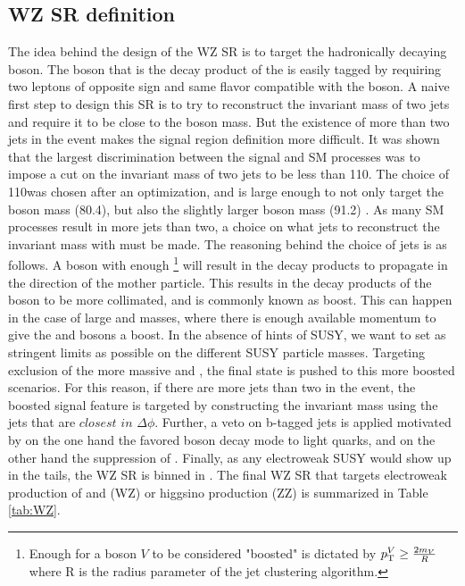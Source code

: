 \subsection{WZ SR definition}
The idea behind the design of the WZ SR is to target the hadronically decaying \PW boson. 
The \PZ boson that is the decay product of the \PSGczDt is easily tagged by requiring two leptons of opposite sign and same flavor compatible with the \PZ boson.
A naive first step to design this SR is to try to reconstruct the invariant mass of two jets and require it to be close to the \PW boson mass.
But the existence of more than two jets in the event makes the signal region definition more difficult. 
It was shown that the largest discrimination between the signal and SM processes was to impose a cut on the invariant mass of two jets to be less than 110\GeV. 
The choice of 110\GeV was chosen after an optimization, and is large enough to not only target the \PW boson mass (80.4\GeV), but also the slightly larger \PZ boson mass (91.2\GeV) \cite{PhysRevD.98.030001}. 
As many SM processes result in more jets than two, a choice on what jets to reconstruct the invariant mass with must be made. 
The reasoning behind the choice of jets is as follows. 
A \PW boson with enough \pt\footnote{Enough \pt for a boson $V$ to be considered "boosted" is dictated by $p_{\mathrm{T}}^{V}\geq\frac{2m_{V}}{R}$ where R is the radius parameter of the jet clustering algorithm.} will result in the decay products to propagate in the direction of the mother particle. 
This results in the decay products of the \PW boson to be more collimated, and is commonly known as boost. 
This can happen in the case of large \PSGczDt and \firstcharg masses, where there is enough available momentum to give the \PZ and \PW bosons a boost. 
In the absence of hints of SUSY, we want to set as stringent limits as possible on the different SUSY particle masses. 
Targeting exclusion of the more massive \PSGczDt and \firstcharg, the final state is pushed to this more boosted scenarios. 
For this reason, if there are more jets than two in the event, the boosted signal feature is targeted by constructing the invariant mass using the jets that are $closest$ $in$ $\Delta\phi$. 
Further, a veto on b-tagged jets is applied motivated by on the one hand the favored \PW boson decay mode to light quarks, and on the other hand the suppression of \ttbar. 
Finally, as any electroweak SUSY would show up in the \ptmiss tails, the WZ SR is binned in \ptmiss. 
The final WZ SR that targets electroweak production of \PSGczDt and \firstcharg (WZ) or higgsino production (ZZ) is summarized in Table \ref{tab:WZ}.    

